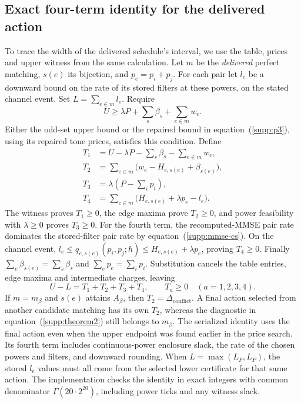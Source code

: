 \subsection{Exact four-term identity for the delivered action}
To trace the width of the delivered schedule's interval, we use the table, prices and upper witness from the same calculation. Let $m$ be the \emph{delivered} perfect matching, $s(e)$ its bijection, and $p_e=p_i+p_j$. For each pair let $l_e$ be a downward bound on the rate of its stored filters at these powers, on the stated channel event. Set $L=\sum_{e\in m}l_e$. Require
\begin{equation}
 U\ge\lambda P+\sum_s\beta_s+\sum_{e\in m}w_e.
 \label{supp:decomposition-witness}
\end{equation}
Either the odd-set upper bound or the repaired bound in equation~(\ref{supp:p3}), using its repaired tone prices, satisfies this condition. Define
\begin{equation}
 \begin{aligned}
 T_1&=U-\lambda P-\sum_s\beta_s-\sum_{e\in m}w_e,\\
 T_2&=\sum_{e\in m}\bigl(w_e-H_{e,s(e)}+\beta_{s(e)}\bigr),\\
 T_3&=\lambda\left(P-\sum_i p_i\right),\\
 T_4&=\sum_{e\in m}\bigl(H_{e,s(e)}+\lambda p_e-l_e\bigr).
 \end{aligned}
 \label{supp:four_terms}
\end{equation}
The witness proves $T_1\ge0$, the edge maxima prove $T_2\ge0$, and power feasibility with $\lambda\ge0$ proves $T_3\ge0$. For the fourth term, the recomputed-MMSE pair rate dominates the stored-filter pair rate by equation~(\ref{supp:mmse-cs}). On the channel event,
$l_e\le q_{e,s(e)}(p_i,p_j;h)\le H_{e,s(e)}+\lambda p_e$, proving $T_4\ge0$. Finally $\sum_e\beta_{s(e)}=\sum_s\beta_s$ and $\sum_e p_e=\sum_i p_i$. Substitution cancels the table entries, edge maxima and intermediate charges, leaving
\begin{equation}
 U-L=T_1+T_2+T_3+T_4,\qquad T_a\ge0\quad(a=1,2,3,4).
 \label{supp:decomposition-identity}
\end{equation}
If $m=m_\beta$ and $s(e)$ attains $A_\beta$, then $T_2=\Delta_{\mathrm{conflict}}$. A final action selected from another candidate matching has its own $T_2$, whereas the diagnostic in equation~(\ref{supp:theorem2}) still belongs to $m_\beta$. The serialized identity uses the final action even when the upper endpoint was found earlier in the price search. Its fourth term includes continuous-power enclosure slack, the rate of the chosen powers and filters, and downward rounding. When $L=\max(L_F,L_P)$, the stored $l_e$ values must all come from the selected lower certificate for that same action. The implementation checks the identity in exact integers with common denominator $\Gamma(20\cdot2^{20})$, including power ticks and any witness slack.

